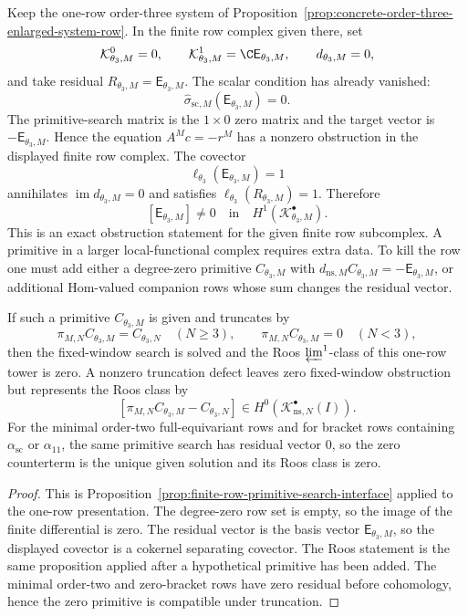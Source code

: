 \begin{prop}\label{prop:theta-three-finite-row-obstruction}
  Keep the one-row order-three system of
  Proposition~\ref{prop:concrete-order-three-enlarged-system-row}.  In the
  finite row complex given there, set
  \[
    \mathcal K^0_{\theta_3,M}=0,\qquad
    \mathcal K^1_{\theta_3,M}=\C\mathsf E_{\theta_3,M},\qquad
    d_{\theta_3,M}=0,
  \]
  and take residual \(R_{\theta_3,M}=\mathsf E_{\theta_3,M}\).  The scalar
  condition has already vanished:
  \[
    \widehat\sigma_{\mathrm{sc},M}(\mathsf E_{\theta_3,M})=0.
  \]
  The primitive-search matrix is the \(1\times0\) zero matrix and the target
  vector is \(-\mathsf E_{\theta_3,M}\).  Hence the equation
  \(A^M c=-r^M\) has a nonzero obstruction in the displayed finite row complex.
  The covector
  \[
    \ell_{\theta_3}(\mathsf E_{\theta_3,M})=1
  \]
  annihilates \(\operatorname{im}d_{\theta_3,M}=0\) and satisfies
  \(\ell_{\theta_3}(R_{\theta_3,M})=1\).  Therefore
  \[
    [\mathsf E_{\theta_3,M}]\neq0
    \quad\text{in}\quad
    H^1(\mathcal K^\bullet_{\theta_3,M}).
  \]
  This is an exact obstruction statement for the given finite row
  subcomplex.  A primitive in a larger local-functional complex requires
  extra data.  To kill the row one must add either a
  degree-zero primitive \(C_{\theta_3,M}\) with
  \(d_{\mathrm{ns},M}C_{\theta_3,M}=-\mathsf E_{\theta_3,M}\), or additional
  Hom-valued companion rows whose sum changes the residual vector.

  If such a primitive \(C_{\theta_3,M}\) is given and truncates by
  \[
    \pi_{M,N}C_{\theta_3,M}=C_{\theta_3,N}\quad(N\geq3),
    \qquad
    \pi_{M,N}C_{\theta_3,M}=0\quad(N<3),
  \]
  then the fixed-window search is solved and the Roos
  \(\varprojlim^1\)-class of this one-row tower is zero.  A nonzero
  truncation defect leaves zero fixed-window obstruction but represents
  the Roos class by
  \[
    [\pi_{M,N}C_{\theta_3,M}-C_{\theta_3,N}]
    \in H^0(\mathcal K^\bullet_{\mathrm{ns},N}(I)).
  \]
  For the minimal order-two full-equivariant rows and for bracket rows
  containing \(\alpha_{\mathrm{sc}}\) or \(\alpha_{11}\), the same primitive
  search has residual vector \(0\), so the zero counterterm is the unique
  given solution and its Roos class is zero.
\end{prop}

\begin{proof}
  This is Proposition~\ref{prop:finite-row-primitive-search-interface}
  applied to the one-row presentation.  The degree-zero row set is empty,
  so the image of the finite differential is zero.  The residual vector is the
  basis vector \(\mathsf E_{\theta_3,M}\), so the displayed covector is a
  cokernel separating covector.  The Roos statement is the same proposition applied
  after a hypothetical primitive has been added.  The minimal order-two and
  zero-bracket rows have zero residual before cohomology, hence the zero
  primitive is compatible under truncation.
\end{proof}

